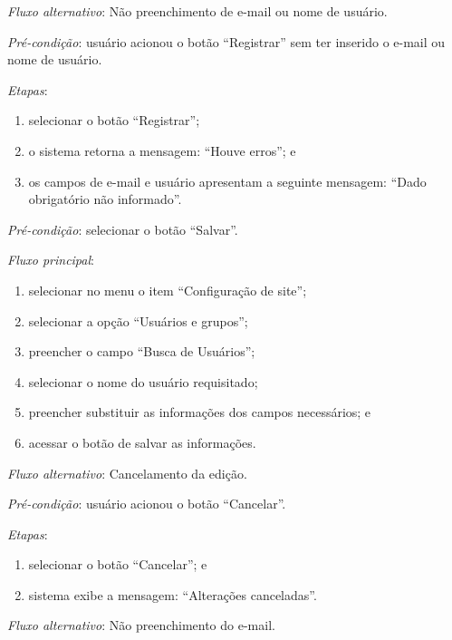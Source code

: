 \noindent \textit{Fluxo alternativo}: Não preenchimento de e-mail ou nome de usuário.

\noindent \textit{Pré-condição}: usuário acionou o botão ``Registrar'' sem ter inserido o e-mail ou nome de usuário.

\noindent \textit{Etapas}:

\begin{enumerate}
    \item selecionar o botão ``Registrar'';
    \item o sistema retorna a mensagem: ``Houve erros''; e
    \item os campos de e-mail e usuário apresentam a seguinte mensagem: ``Dado obrigatório não informado''.
\end{enumerate}




\vspace{0.7cm}

\noindent \textit{Pré-condição}: selecionar o botão ``Salvar''.

\noindent \textit{Fluxo principal}:

\begin{enumerate}
    \item selecionar no menu o item ``Configuração de site'';
    \item selecionar a opção ``Usuários e grupos'';
    \item preencher o campo ``Busca de Usuários'';
    \item selecionar o nome do usuário requisitado;
    \item preencher substituir as informações dos campos necessários; e
    \item acessar o botão de salvar as informações.
\end{enumerate}

\noindent \textit{Fluxo alternativo}: Cancelamento da edição.

\noindent \textit{Pré-condição}: usuário acionou o botão ``Cancelar''.

\noindent \textit{Etapas}:

\begin{enumerate}
    \item selecionar o botão ``Cancelar''; e
    \item sistema exibe a mensagem: ``Alterações canceladas''.
\end{enumerate}

\noindent \textit{Fluxo alternativo}: Não preenchimento do e-mail.

